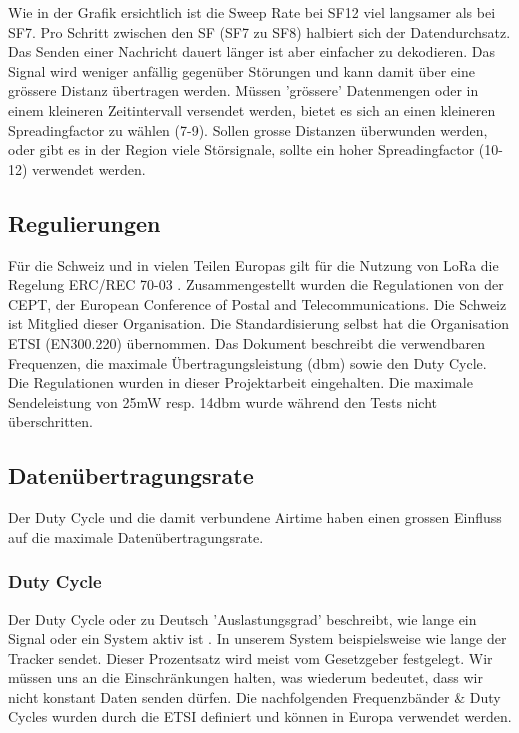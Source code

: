 \documentclass[11pt,english,german]{report}
\theoremstyle{definition}
\begin{document}
\noindent
Wie in der Grafik ersichtlich ist die Sweep Rate bei SF12 viel langsamer als bei SF7. Pro Schritt zwischen den SF (SF7 zu SF8) halbiert sich der Datendurchsatz. Das Senden einer Nachricht dauert länger ist aber einfacher zu dekodieren. Das Signal wird weniger anfällig gegenüber Störungen und kann damit über eine grössere Distanz übertragen werden. Müssen 'grössere' Datenmengen oder in einem kleineren Zeitintervall versendet werden, bietet es sich an einen kleineren Spreadingfactor zu wählen (7-9).  Sollen grosse Distanzen überwunden werden, oder gibt es in der Region viele Störsignale, sollte ein hoher Spreadingfactor (10-12) verwendet werden.

\newpage
\subsection{Regulierungen}
Für die Schweiz und in vielen Teilen Europas gilt für die Nutzung von LoRa die Regelung ERC/REC 70-03 \cite{regulations}. Zusammengestellt wurden die Regulationen von der CEPT, der European Conference of Postal and Telecommunications. Die Schweiz ist Mitglied dieser Organisation. Die Standardisierung selbst hat die Organisation ETSI (EN300.220) übernommen. Das Dokument beschreibt die verwendbaren Frequenzen, die maximale Übertragungsleistung (dbm) sowie den Duty Cycle.\\[0.3cm]
Die Regulationen wurden in dieser Projektarbeit eingehalten. Die maximale Sendeleistung von 25mW resp. 14dbm wurde während den Tests nicht überschritten.

\subsection{Datenübertragungsrate}
Der Duty Cycle und die damit verbundene Airtime haben einen grossen Einfluss auf die maximale Datenübertragungsrate. 
\subsubsection{Duty Cycle}
Der Duty Cycle oder zu Deutsch 'Auslastungsgrad' beschreibt, wie lange ein Signal oder ein System aktiv ist \cite{wikiduty}. In unserem System beispielsweise wie lange der Tracker sendet. Dieser Prozentsatz wird meist vom Gesetzgeber festgelegt. Wir müssen uns an die Einschränkungen halten, was wiederum bedeutet, dass wir nicht konstant Daten senden dürfen. Die nachfolgenden Frequenzbänder \& Duty Cycles wurden durch die ETSI definiert und können in Europa verwendet werden\cite{lorawanfreq}.
\end{document}
